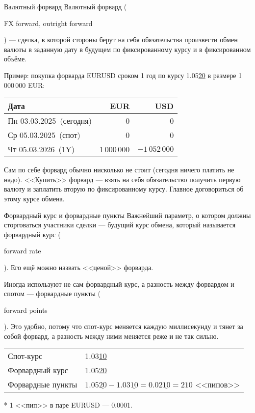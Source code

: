\documentclass{beamer}
\newcommand{\en}[1]{\begin{otherlanguage}{english}#1\end{otherlanguage}}
\newcommand{\eurusdBigFigures}{1.03}
\newcommand{\eurusdBigFiguresPlusTwo}{1.05}
\newcommand{\eurusdBigFiguresPlusTwoPerMillion}{1\,05}
\newcommand{\eurusdBusinessDate}{Пн 03.03.2025}
\newcommand{\eurusdSpotDate}{Ср 05.03.2025}
\newcommand{\eurusdOneYearDate}{Чт 05.03.2026}
\begin{document}
\begin{frame}{Валютный форвард}
\justify
\alert{Валютный форвард} (\en{FX forward, outright forward}) --- сделка, в которой стороны берут 
на себя обязательства произвести обмен валюты в заданную дату в будущем по 
фиксированному курсу и в фиксированном объёме. 

\justify
Пример: покупка форварда EURUSD сроком 1 год по курсу \eurusdBigFiguresPlusTwo\underline{20} в размере 1\,000\,000 EUR:

\centering
\begin{tabular}{l|r|r}
Дата                          & EUR & USD \\ \hline
\eurusdBusinessDate\ (сегодня)  & 0   & 0   \\
\eurusdSpotDate\ (спот) & 0   & 0   \\
\eurusdOneYearDate\ (1Y)   & 1\,000\,000 & $-\eurusdBigFiguresPlusTwoPerMillion 2\,000$
\end{tabular}

\justify
Сам по себе форвард обычно нисколько не стоит (сегодня ничего платить не надо). <<Купить>> форвард --- взять на себя обязательство получить первую валюту и заплатить вторую по фиксированному курсу. Главное договориться об этому курсе обмена.
\end{frame}



\begin{frame}{Форвардный курс и форвардные пункты}
\justify
Важнейший параметр, о котором должны сторговаться участники сделки --- будущий курс обмена, который называется \alert{форвардный курс} (\en{forward rate}). Его ещё можно назвать <<ценой>> форварда.

\justify
Иногда используют не сам форвардный курс, а разность между форвардом и спотом --- \alert{форвардные пункты} (\en{forward points}). Это удобно, потому что спот-курс меняется каждую миллисекунду и тянет за собой форвард, а разность между ними меняется реже и не так сильно.

\vspace{\baselineskip}
\centering
\begin{tabular}{l|l}
Спот-курс & \eurusdBigFigures\underline{10} \\
Форвардный курс & \eurusdBigFiguresPlusTwo\underline{20} \\
\hline
Форвардные пункты & $\eurusdBigFiguresPlusTwo\underline{20} - \eurusdBigFigures\underline{10} = 0.02\underline{10 }= 210$ <<пипов>>
\end{tabular}

\justify
* 1 <<пип>> в паре EURUSD --- 0.0001.
\end{frame}
\end{document}
